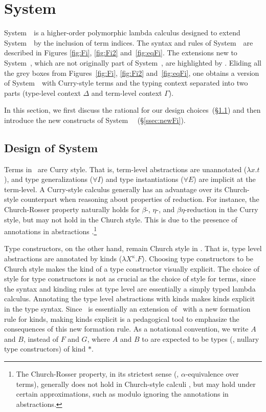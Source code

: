 \section{System \Fi}\label{sec:fi:fi}
System~\Fi\ is a higher-order polymorphic lambda calculus 
designed to extend System~\Fw\ by the inclusion of term indices.
The syntax and rules of System~\Fi\ are described in
Figures \ref{fig:Fi}, \ref{fig:Fi2} and~\ref{fig:eqFi}. 
The extensions new to System~\Fi, which are not originally part of System~\Fw,
are highlighted by .  Eliding all the grey boxes from
Figures~\ref{fig:Fi}, \ref{fig:Fi2} and~\ref{fig:eqFi}, one obtains
a version of System~\Fw\ with Curry-style terms and the typing context
separated into two parts (type-level context $\Delta$ and
term-level context $\Gamma$). 

In this section, we first discuss the rational for our design
choices~(\S\ref{ssec:rationale}) and then introduce the new constructs of
System~\Fi\ %
(\S\ref{ssec:newFi}).


\subsection{Design of System \Fi%
} \label{ssec:rationale}
Terms in \Fi\ are Curry style. That is, term-level abstractions are unannotated
($\lambda x.t$), and type generalizations ($\forall I$) and type instantiations
($\forall E$) are implicit at the term-level. A Curry-style calculus generally has
an advantage over its Church-style counterpart when reasoning about properties of
reduction. For instance, the Church-Rosser property naturally holds for 
$\beta$-, $\eta$-, and $\beta\eta$-reduction in the Curry style, but
may not hold in the Church style. This is due to the presence of annotations in
abstractions \cite{Miquel01}.\footnote{The Church-Rosser property,
in its strictest sense (\ie, $\alpha$-equivalence over terms),
generally does not hold in Church-style calculi , but may hold under
	certain approximations, such as modulo ignoring the annotations
	in abstractions.}

Type constructors, on the other hand, remain Church style in \Fi. That is, type level abstractions are
annotated by kinds ($\lambda X^\kappa.F$). Choosing type constructors
to be Church style makes the kind of
a type constructor visually explicit. The choice of style for type constructors
is not as crucial as the choice of style for terms, since the syntax and
kinding rules at type level are essentially a simply typed lambda calculus.
Annotating the type level abstractions with kinds makes kinds
explicit in the type syntax. Since \Fi\ is essentially an extension of \Fw\
with a new formation rule for kinds, making kinds explicit is a pedagogical
tool to emphasize the consequences of this new formation rule.
As a notational convention, we write
$A$ and $B$, instead of $F$ and $G$, where $A$ and $B$ to are expected
to be types (\ie, nullary type constructors) of kind $*$.

